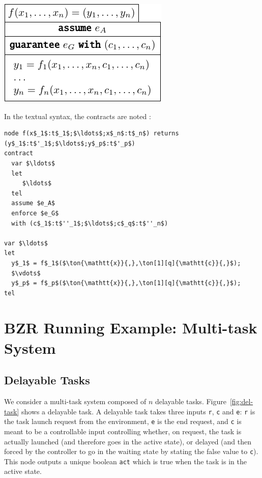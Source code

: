 \documentclass[a4paper]{article}
\begin{document}
\begin{center}
\includegraphics{figures/node-contract}
\end{center}

In the textual syntax, the contracts are noted :
\begin{lstlisting}
node f(x$_1$:t$_1$;$\ldots$;x$_n$:t$_n$) returns (y$_1$:t$'_1$;$\ldots$;y$_p$:t$'_p$)
contract
  var $\ldots$
  let
     $\ldots$
  tel
  assume $e_A$
  enforce $e_G$
  with (c$_1$:t$''_1$;$\ldots$;c$_q$:t$''_n$)

var $\ldots$
let
  y$_1$ = f$_1$($\ton{\mathtt{x}}{,},\ton[1][q]{\mathtt{c}}{,}$); 
  $\vdots$
  y$_p$ = f$_p$($\ton{\mathtt{x}}{,},\ton[1][q]{\mathtt{c}}{,}$); 
tel
\end{lstlisting}

\section{BZR Running Example:  Multi-task System}
\label{sec:multi-task-system}

\subsection{Delayable Tasks}
\label{sec:delayable-tasks}



We consider a multi-task system composed of $n$ delayable
tasks. Figure~\ref{fig:del-task} shows a delayable task. A delayable task takes
three inputs \texttt{r}, \texttt{c} and \texttt{e}: \texttt{r} is the task
launch request from the environment, \texttt{e} is the end request, and
\texttt{c} is meant to be a controllable input controlling whether, on request,
the task is actually launched (and therefore goes in the active state), or
delayed (and then forced by the controller to go in the waiting state by stating
the false value to \texttt{c}). This node outputs a unique boolean \texttt{act}
which is true when the task is in the active state.
\end{document}
